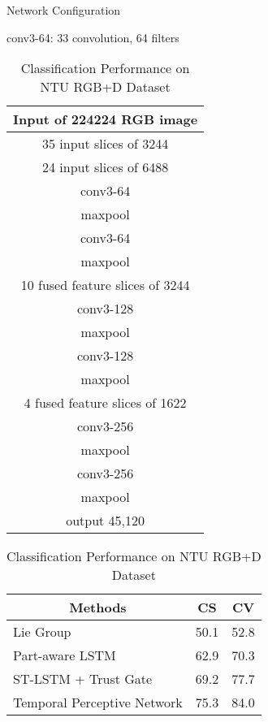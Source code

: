\documentclass{bmvc2k}
\def \hfillx {\hspace*{-\textwidth} \hfill}
\begin{document}
\begin{table}[t]
	\footnotesize 
\begin{minipage}{0.4\textwidth}
			\centering \caption{Network Configuration}
		\label{tab:config}
		\begin{tablenotes}
			\scriptsize
			\item \hspace{0.3cm} conv3-64: 33 convolution, 64 filters\\
		\end{tablenotes}
		\begin{tabular}{|c|}
			\hline
			Input of 224224 RGB image\\
			\hline
			35 input slices of 3244\\
			\hline
			24 input slices of 6488\\
			\hline
			conv3-64\\
			maxpool\\
			conv3-64\\
			maxpool\\
			\hline
			10 fused feature slices of 3244\\
			\hline
			conv3-128\\
			maxpool\\
			conv3-128\\
			maxpool\\
			\hline
			4 fused feature slices of 1622\\
			\hline
			conv3-256\\
			maxpool \\
			conv3-256\\
			maxpool \\
			\hline
			output 45,120 \\
			\hline
		\end{tabular}
	\end{minipage}
	\hfillx
	\begin{minipage}{0.6\textwidth}
		\centering \caption{Classification Performance on NTU RGB+D Dataset}
		\label{tab:table1}
		\begin{tabular}{|l|r|r|}
			\hline
			\multicolumn{1}{|c|}{Methods} & \multicolumn{1}{c|}{CS}& \multicolumn{1}{c|}{CV}\\
			\hline
			Lie Group \cite{vemulapalli2014human} & 50.1 & 52.8\\
			Part-aware LSTM \cite{shahroudy2016ntu} & 62.9 & 70.3 \\
			ST-LSTM + Trust Gate \cite{liu2016spatio} & 69.2 & 77.7 \\
			Temporal Perceptive Network \cite{hutemporal} & 75.3 & 84.0 \\

\end{tabular}
\end{minipage}
\end{table}
\end{document}
